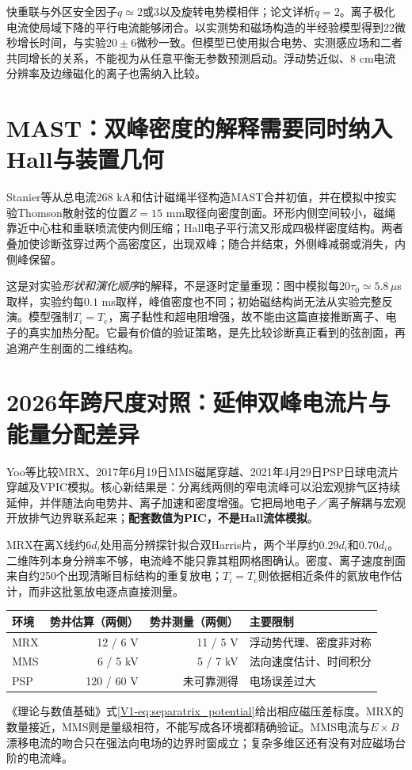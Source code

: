 \documentclass[UTF8,a4paper,11pt,openany,fontset=fandol]{ctexbook}
\begin{document}
快重联与外区安全因子$q\simeq2$或3以及旋转电势模相伴；论文详析$q=2$。离子极化电流使局域下降的平行电流能够闭合。以实测势和磁场构造的半经验模型得到22微秒增长时间，与实验$20\pm6$微秒一致。但模型已使用拟合电势、实测感应场和二者共同增长的关系，不能视为从任意平衡无参数预测启动。浮动势近似、8 cm电流分辨率及边缘磁化的离子也需纳入比较。

\section{MAST：双峰密度的解释需要同时纳入Hall与装置几何}
Stanier等从总电流268 kA和估计磁绳半径构造MAST合并初值，并在模拟中按实验Thomson散射弦的位置$Z=15$ mm取径向密度剖面。环形内侧空间较小，磁绳靠近中心柱和重联喷流使内侧压缩；Hall电子平行流又形成四极样密度结构。两者叠加使诊断弦穿过两个高密度区，出现双峰；随合并结束，外侧峰减弱或消失，内侧峰保留。\citep{Stanier2013}

这是对实验\emph{形状和演化顺序}的解释，不是逐时定量重现：图中模拟每$20\tau_0\simeq5.8\,\mu$s取样，实验约每$0.1$ ms取样，峰值密度也不同；初始磁结构尚无法从实验完整反演。模型强制$T_i=T_e$，离子黏性和超电阻增强，故不能由这篇直接推断离子、电子的真实加热分配。它最有价值的验证策略，是先比较诊断真正看到的弦剖面，再追溯产生剖面的二维结构。

\section{2026年跨尺度对照：延伸双峰电流片与能量分配差异}
Yoo等比较MRX、2017年6月19日MMS磁尾穿越、2021年4月29日PSP日球电流片穿越及VPIC模拟。核心新结果是：分离线两侧的窄电流峰可以沿宏观排气区持续延伸，并伴随法向电势井、离子加速和密度增强。它把局地电子／离子解耦与宏观开放排气边界联系起来；\textbf{配套数值为PIC，不是Hall流体模拟}。\citep{L312}

MRX在离X线约$6d_i$处用高分辨探针拟合双Harris片，两个半厚约$0.29d_i$和$0.70d_i$。二维阵列本身分辨率不够，电流峰不能只靠其粗网格图确认。密度、离子速度剖面来自约250个出现清晰目标结构的重复放电；$T_i=T_e$则依据相近条件的氦放电作估计，而非这批氢放电逐点直接测量。

\begin{center}\small
\begin{tabular}{lrrl}\toprule
环境 & 势井估算（两侧） & 势井测量（两侧） & 主要限制\\\midrule
MRX &12 / 6 V&11 / 5 V&浮动势代理、密度非对称\\
MMS &6 / 5 kV&5 / 7 kV&法向速度估计、时间积分\\
PSP &120 / 60 V&未可靠测得&电场误差过大\\\bottomrule
\end{tabular}\end{center}
《理论与数值基础》式\eqref{V1-eq:separatrix_potential}给出相应磁压差标度。MRX的数量接近，MMS则是量级相符，不能写成各环境都精确验证。MMS电流与$E\times B$漂移电流的吻合只在强法向电场的边界时窗成立；复杂多维区还有没有对应磁场台阶的电流峰。
\end{document}
